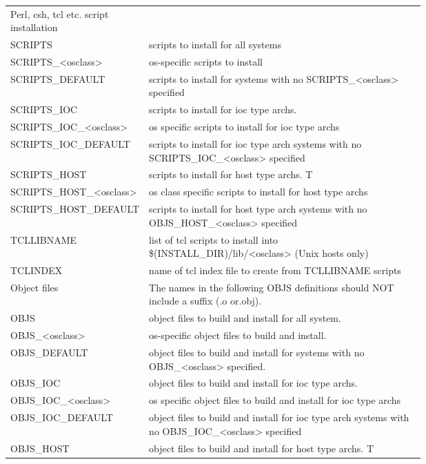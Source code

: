 \begin{center}
\begin{longtable}{lp{0.7\linewidth}}
Perl, csh, tcl etc. script installation &    \\
SCRIPTS & scripts to install for all systems\\
SCRIPTS\_\textless{}osclass\textgreater{} & os-specific scripts to install\\
SCRIPTS\_DEFAULT & scripts to install for systems with no SCRIPTS\_\textless{}osclass\textgreater{} specified\\
SCRIPTS\_IOC & scripts to install for ioc type archs.\\
SCRIPTS\_IOC\_\textless{}osclass\textgreater{} & os specific scripts to install for ioc type archs\\
SCRIPTS\_IOC\_DEFAULT & scripts to install for ioc type arch systems with no SCRIPTS\_IOC\_\textless{}osclass\textgreater{} specified\\
SCRIPTS\_HOST & scripts to install for host type archs. T\\
SCRIPTS\_HOST\_\textless{}osclass\textgreater{} & os class specific scripts to install for host type archs\\
SCRIPTS\_HOST\_DEFAULT & scripts to install for host type arch systems with no OBJS\_HOST\_\textless{}osclass\textgreater{} specified\\
TCLLIBNAME & list of tcl scripts to install into \$(INSTALL\_DIR)/lib/\textless{}osclass\textgreater{} (Unix hosts only)\\
TCLINDEX & name of tcl index file to create from TCLLIBNAME scripts\\
Object files & The names in the following OBJS definitions should NOT include a suffix (.o or.obj).\\
OBJS & object files to build and install for all system. \\
OBJS\_\textless{}osclass\textgreater{} & os-specific object files to build and install. \\
OBJS\_DEFAULT & object files to build and install for systems with no OBJS\_\textless{}osclass\textgreater{} specified.\\
OBJS\_IOC & object files to build and install for ioc type archs.\\
OBJS\_IOC\_\textless{}osclass\textgreater{} & os specific object files to build and install for ioc type archs\\
OBJS\_IOC\_DEFAULT & object files to build and install for ioc type arch systems with no OBJS\_IOC\_\textless{}osclass\textgreater{} specified\\
OBJS\_HOST & object files to build and install for host type archs. T\\

\end{longtable}
\end{center}
